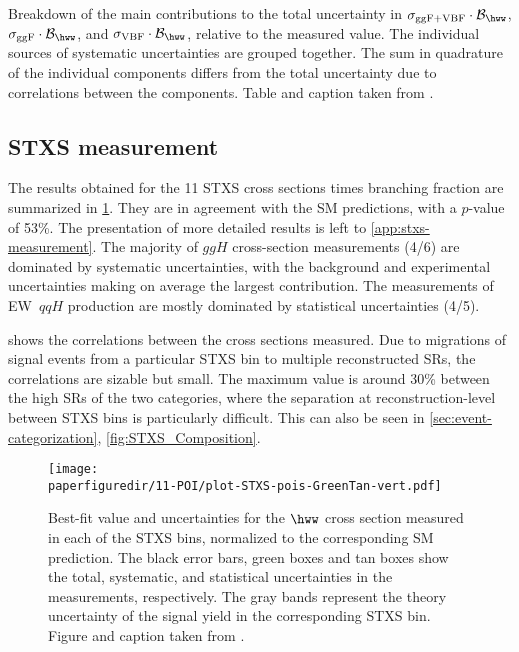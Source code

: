 \begin{table}[ht]
  \centering
  \caption{
    Breakdown of the main contributions to the total uncertainty in $\sigma_{\mathrm{ggF+VBF}} \cdot \mathcal{B}_{\hww}$, $\sigma_{\mathrm{ggF}} \cdot \mathcal{B}_{\hww}$, and $\sigma_{\mathrm{VBF}} \cdot \mathcal{B}_{\hww}$, relative to the measured value.
    The individual sources of systematic uncertainties are grouped together.
    The sum in quadrature of the individual components differs from the total uncertainty due to correlations between the components.
    Table and caption taken from .
  }
  \resizebox{\textwidth}{!}{
    
  }
  \label{tab:UncertaintyBreakdown_2-POI}
\end{table}

\subsection{STXS measurement}
The results obtained for the 11 STXS cross sections times branching fraction are summarized in \cref{fig:11-POI_measurement}. 
They are in agreement with the SM predictions, with a $p$-value of 53\%.
The presentation of more detailed results is left to \cref{app:stxs-measurement}. 
The majority of $ggH$ cross-section measurements (4/6) are dominated by systematic uncertainties, with the background and experimental uncertainties making on average the largest contribution. 
The measurements of EW~$qqH$ production are mostly dominated by statistical uncertainties (4/5). 

 shows the correlations between the cross sections measured. 
Due to migrations of signal events from a particular STXS bin to multiple reconstructed SRs, the correlations are sizable but small. The maximum value is around 30\% between the high \pTH SRs of the two \TwoJet categories, where the separation at reconstruction-level between STXS bins is particularly difficult. This can also be seen in \cref{sec:event-categorization}, \cref{fig:STXS_Composition}. 
\begin{figure}[htb]
  \centering
  \texttt{[image: \\paperfiguredir/11-POI/plot-STXS-pois-GreenTan-vert.pdf]}
  \caption{
    Best-fit value and uncertainties for the $\hww$ cross section measured in each of the STXS bins, normalized to the corresponding SM prediction.
    The black error bars, green boxes and tan boxes show the total, systematic, and statistical uncertainties in the measurements, respectively.
    The gray bands represent the theory uncertainty of the signal yield in the corresponding STXS bin.
    Figure and caption taken from .
    \label{fig:11-POI_measurement}
  }
\end{figure}

